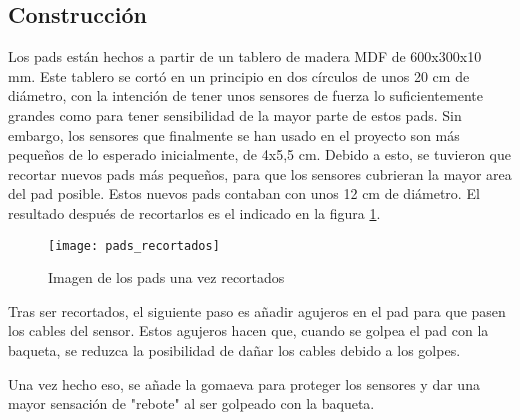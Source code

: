 
        \subsection{Construcción} %
        \label{sub:ConstruccionPads}

            Los pads están hechos a partir de un tablero de madera MDF de 600x300x10 mm. Este tablero se cortó en un
            principio en dos círculos de unos 20 cm de diámetro, con la intención de tener unos sensores de fuerza lo
            suficientemente grandes como para tener sensibilidad de la mayor parte de estos pads. Sin embargo, los
            sensores que finalmente se han usado en el proyecto son más pequeños de lo esperado inicialmente, de
            4x5,5 cm. Debido a esto, se tuvieron que recortar nuevos pads más pequeños, para que los sensores cubrieran
            la mayor area del pad posible. Estos nuevos pads contaban con unos 12 cm de diámetro. El resultado después
            de recortarlos es el indicado en la figura \ref{fig:PadsRecortados}.

            \begin{figure}[ht]
                \centering
                \texttt{[image: pads\_recortados]}
                \caption{Imagen de los pads una vez recortados\label{fig:PadsRecortados}}
            \end{figure}

            Tras ser recortados, el siguiente paso es añadir agujeros en el pad para que pasen los cables del sensor.
            Estos agujeros hacen que, cuando se golpea el pad con la baqueta, se reduzca la posibilidad de dañar los
            cables debido a los golpes.


            Una vez hecho eso, se añade la gomaeva para proteger los sensores y dar una mayor sensación de "rebote" %
            al ser golpeado con la baqueta.

        

